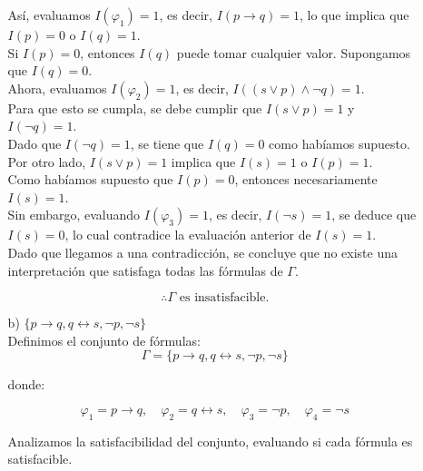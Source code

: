 \documentclass[11pt,letterpaper]{article}
\begin{document}
\begin{enumerate}
\begin{itemize}
         Así, evaluamos $I(\varphi_1) = 1$, es decir, $I(p \rightarrow q) = 1$, lo que implica que $I(p) = 0$ o $I(q) = 1$.\\
         
         Si $I(p) = 0$, entonces $I(q)$ puede tomar cualquier valor. Supongamos que $I(q) = 0$.\\

         Ahora, evaluamos $I(\varphi_2) = 1$, es decir, $I((s \vee p) \land \neg q) = 1$.\\
         
         Para que esto se cumpla, se debe cumplir que $I(s \vee p) = 1$ y $I(\neg q) = 1$.\\
         
         Dado que $I(\neg q) = 1$, se tiene que $I(q) = 0$ como habíamos supuesto.\\

         Por otro lado, $I(s \vee p) = 1$ implica que $I(s) = 1$ o $I(p) = 1$.\\
         
         Como habíamos supuesto que $I(p) = 0$, entonces necesariamente $I(s) = 1$.\\

         Sin embargo, evaluando $I(\varphi_3) = 1$, es decir, $I(\neg s) = 1$,
         se deduce que $I(s) = 0$, lo cual contradice la evaluación anterior de $I(s) = 1$.\\

         Dado que llegamos a una contradicción, se concluye que no existe una interpretación que satisfaga todas las fórmulas de $\Gamma$.  

         \[
         \therefore \Gamma \text{ es insatisfacible.}
         \]

         \bigskip
         
       \item[b)] $\{ p \rightarrow q, q \leftrightarrow s, \neg p, \neg s \}$\\
         
         Definimos el conjunto de fórmulas:
         \[
         \Gamma = \{ p \rightarrow q, q \leftrightarrow s, \neg p, \neg s \}
         \]

         donde:

         \[
         \varphi_1 = p \rightarrow q, \quad \varphi_2 = q \leftrightarrow s, \quad \varphi_3 = \neg p, \quad \varphi_4 = \neg s
         \]

         Analizamos la satisfacibilidad del conjunto, evaluando si cada fórmula es satisfacible.\\
         

\end{itemize}
\end{enumerate}
\end{document}
